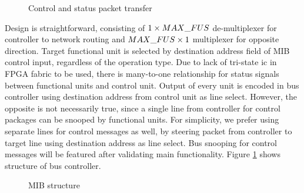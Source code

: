 	\begin{figure}[!h]
	\centering
	\hfill
	
	\caption{Control and status packet transfer}
	\end{figure}
	
		Design is straightforward, consisting of $1\times MAX\_FUS$ de-multiplexer for controller to network routing and $MAX\_FUS\times 1$ multiplexer for opposite direction. Target functional unit is selected by destination address field of MIB control input, regardless of the operation type.  Due to lack of tri-state ic in FPGA fabric to be used, there is many-to-one relationship for status signals between functional units and control unit. Output of every unit is encoded in bus controller using destination address from control unit as line select. However, the opposite is not necessarily true, since a single line from controller for control packages can be snooped by functional units. For simplicity, we prefer using separate lines for control messages as well, by steering packet from controller to target line using destination address as line select. Bus snooping for control messages will be featured after validating main functionality. Figure \ref{fig:mib} shows structure of bus controller.
	\begin{figure}[!htbp]
		\centering
		\def\svgscale{0.50}
		
		\caption{MIB structure}
		\label{fig:mib} 
	\end{figure}